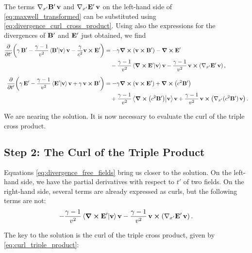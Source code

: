 \documentclass[12pt]{article}
\begin{document}
The terms $\nabla_{x'}\vb{B}'\,\vb{v}$ and
$\nabla_{x'}\vb{E}'\,\vb{v}$ on the left-hand side of
\eqref{eq:maxwell_transformed} can be substituted using
\eqref{eq:divergence_curl_cross_product}. Using also the expressions for the divergences of
$\vb{B}'$ and $\vb{E}'$ just obtained, we find
\begin{equation}
  \begin{aligned}
    \pdv{}{t'}\!\left(
        \gamma\,\vb{B}'
        -
        \frac{\gamma-1}{v^2}\ip{\vb{B}'}{\vb{v}}\vb{v}
        -
        \frac{\gamma}{c^2}\vb{v}\cross\vb{E}'
      \right)
    &=
      -\gamma\curl(\vb{v}\cross\vb{B}')
      -
      \curl\vb{E}'
      \\
    &\quad
      -
      \frac{\gamma-1}{v^2}
      \ip{\curl\vb{E}'}{\vb{v}}\vb{v}
      -
      \frac{\gamma-1}{v^2}\,
      \vb{v}\cross
      \left(
        \nabla_{x'}\vb{E}'\,\vb{v}
      \right),
    \\[6pt]
    \pdv{}{t'}\!\left(
        \gamma\,\vb{E}'
        -
        \frac{\gamma-1}{v^2}\ip{\vb{E}'}{\vb{v}}\vb{v}
        +
        \gamma\,\vb{v}\cross\vb{B}'
      \right)
    &=
      -\gamma\curl(\vb{v}\cross\vb{E}')
      +
      \curl(c^2\vb{B}')
      \\
    &\quad
      +
      \frac{\gamma-1}{v^2}
      \ip{\curl(c^2\vb{B}')}{\vb{v}}\vb{v}
      +
      \frac{\gamma-1}{v^2}\,
      \vb{v}\cross
      \left(
        \nabla_{x'}(c^2\vb{B}')\,\vb{v}
      \right).
  \end{aligned}
  \label{eq:divergence_free_fields}
\end{equation}

We are nearing the solution. It is now necessary to evaluate the curl of the triple
cross product.

\subsection{Step 2: The Curl of the Triple Product}

Equations \eqref{eq:divergence_free_fields} bring us closer to the solution. On the
left-hand side, we have the partial derivatives with respect to $t'$ of two fields. On the
right-hand side, several terms are already expressed as curls, but the following terms are
not:
\[
  -\frac{\gamma-1}{v^2}\ip{\curl \vb{E}'}{\vb{v}}\vb{v}
  -
  \frac{\gamma-1}{v^2}\,
  \vb{v}\cross
  \left(
    \nabla_{x'}\vb{E}'\,\vb{v}
  \right).
\]

The key to the solution is the curl of the triple cross product, given by
\eqref{eq:curl_triple_product}:
\end{document}
